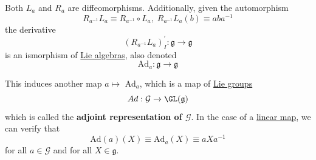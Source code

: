   Both $L_a$ and $R_a$ are diffeomorphisms. Additionally, given the automorphism
  \begin{equation}
    R_{a^{-1}} L_a \equiv R_{a^{-1}} \circ L_a, \; R_{a^{-1}} L_a (b) \equiv a b a^{-1}
  \end{equation}
  the derivative
  \begin{equation}
    (R_{a^{-1}} L_a)^\prime_I: \mathfrak{g} \rightarrow \mathfrak{g}
  \end{equation}
  is an ismorphism of \hyperref[def:lie-algebra]{Lie algebras}, also denoted 
  \begin{equation}
    \text{Ad}_a: \mathfrak{g} \rightarrow \mathfrak{g}
  \end{equation}

  \begin{definition}
    \label{def:the-adjoint-map-of-a-lie-group}
    This induces another map $a \mapsto$ Ad$_a$, which is a map of \hyperref[def:lie-group]{Lie groups}
    \begin{equation}
      Ad: \mathcal{G} \rightarrow \GL(\mathcal{\mathfrak{g}})
    \end{equation}
    which is called the \textbf{adjoint representation of $\mathcal{G}$}. In the case of a \hyperref[thm:linear-map]{linear map}, we can verify that 
    \begin{equation}
      \text{Ad}(a) (X) \equiv \text{Ad}_a (X) \equiv a X a^{-1}
    \end{equation}
    for all $a \in \mathcal{G}$ and for all $X \in \mathfrak{g}$. 
  \end{definition}

